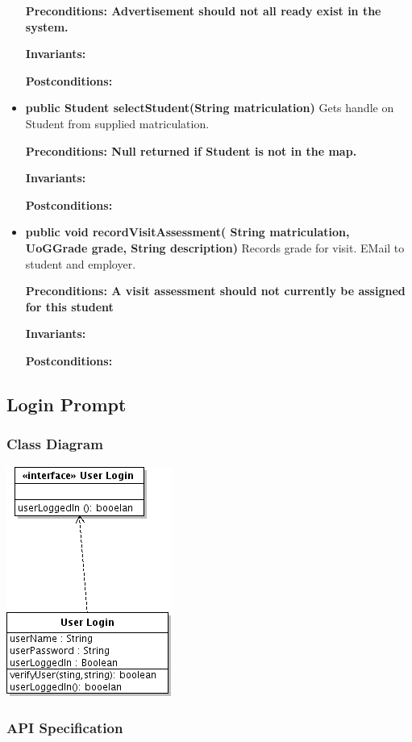 \documentclass[11pt]{article}
\begin{document}
\begin{itemize}
{\textbf{Preconditions: Advertisement should not all ready exist in the
  system.}

\textbf{Invariants:} 

\textbf{Postconditions:} }
\item{\textbf{public Student selectStudent(String matriculation)}
Gets handle on Student from supplied matriculation.

\textbf{Preconditions: Null returned if Student is not in the map.}

\textbf{Invariants:} 

\textbf{Postconditions:} }
\item{\textbf{public void recordVisitAssessment( String matriculation,
    UoGGrade grade, String description)}
Records grade for visit. EMail to student and employer.

\textbf{Preconditions: A visit assessment should not currently be
  assigned for this student}

\textbf{Invariants:} 

\textbf{Postconditions:} }

\end{itemize}

\subsection{Login Prompt}

\subsubsection{Class Diagram}

\includegraphics{Login.png}

\subsubsection{API Specification}
\end{document}
